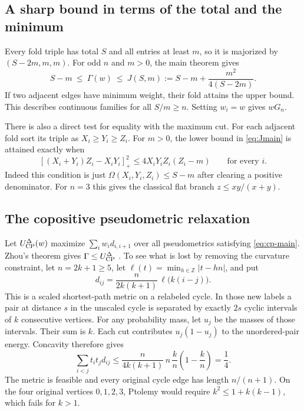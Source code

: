 \documentclass[11pt,a4paper]{article}
\theoremstyle{definition}
\newcommand{\Zhou}{U_{\rm CP}^{\Delta}}
\begin{document}
\subsection{A sharp bound in terms of the total and the minimum}

Every fold triple has total \(S\) and all entries at least \(m\), so it is majorized by \((S-2m,m,m)\). For odd \(n\) and \(m>0\), the main theorem gives
\begin{equation}\label{eq:Jmain}
 S-m\ \le\ \Gamma(w)\ \le\ J(S,m)
 := S-m+\frac{m^2}{4(S-2m)}.
\end{equation}
If two adjacent edges have minimum weight, their fold attains the upper bound. This describes continuous families for all \(S/m\ge n\). Setting \(w_i=w\) gives \(wG_n\).

There is also a direct test for equality with the maximum cut. For each adjacent fold sort its triple as \(X_i\ge Y_i\ge Z_i\). For \(m>0\), the lower bound in \eqref{eq:Jmain} is attained exactly when
\[
  [(X_i+Y_i)Z_i-X_iY_i]_+^2
   \le 4X_iY_iZ_i(Z_i-m)
   \qquad\text{for every }i .
\]
Indeed this condition is just \(\Omega(X_i,Y_i,Z_i)\le S-m\) after clearing a positive denominator. For \(n=3\) this gives the classical flat branch \(z\le xy/(x+y)\).

\subsection{The copositive pseudometric relaxation}

Let \(\Zhou(w)\) maximize \(\sum_i w_i d_{i,i+1}\) over all pseudometrics satisfying \eqref{eq:cp-main}. Zhou's theorem gives \(\Gamma\le\Zhou\) \cite{Zhou}. To see what is lost by removing the curvature constraint, let \(n=2k+1\ge5\), let \(\ell(t)=\min_{h\in\mathbb Z}|t-hn|\), and put
\[
 d_{ij}=\frac{n}{2k(k+1)}\,\ell\bigl(k(i-j)\bigr).
\]
This is a scaled shortest-path metric on a relabeled cycle. In those new labels a pair at distance \(s\) in the unscaled cycle is separated by exactly \(2s\) cyclic intervals of \(k\) consecutive vertices. For any probability mass, let \(u_j\) be the masses of those intervals. Their sum is \(k\). Each cut contributes \(u_j(1-u_j)\) to the unordered-pair energy. Concavity therefore gives
\[
 \sum_{i<j}t_it_jd_{ij}
 \le\frac{n}{4k(k+1)}\,n\,\frac kn\left(1-\frac kn\right)=\frac14 .
\]
The metric is feasible and every original cycle edge has length \(n/(n+1)\). On the four original vertices \(0,1,2,3\), Ptolemy would require \(k^2\le1+k(k-1)\), which fails for \(k>1\).
\end{document}
